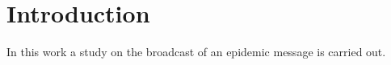 \chapter{Introduction}

In this work a study on the broadcast of an epidemic message is carried out.
